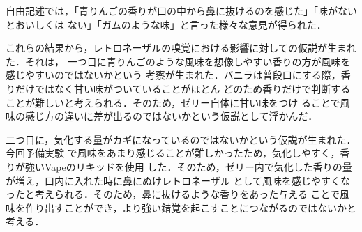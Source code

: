 自由記述では，「青りんごの香りが口の中から鼻に抜けるのを感じた」「味がないとおいしくは
ない」「ガムのような味」と言った様々な意見が得られた．


これらの結果から，レトロネーザルの嗅覚における影響に対しての仮説が生まれた．それは，
一つ目に青りんごのような風味を想像しやすい香りの方が風味を感じやすいのではないかという
考察が生まれた．バニラは普段口にする際，香りだけではなく甘い味がついていることがほとん
どのため香りだけで判断することが難しいと考えられる．そのため，ゼリー自体に甘い味をつけ
ることで風味の感じ方の違いに差が出るのではないかという仮説として浮かんだ．


二つ目に，気化する量がカギになっているのではないかという仮説が生まれた．今回予備実験
で風味をあまり感じることが難しかったため，気化しやすく，香りが強いVapeのリキッドを使用
した．そのため，ゼリー内で気化した香りの量が増え，口内に入れた時に鼻にぬけレトロネーザル
として風味を感じやすくなったと考えられる．そのため，鼻に抜けるような香りをあった与える
ことで風味を作り出すことができ，より強い錯覚を起こすことにつながるのではないかと考える．